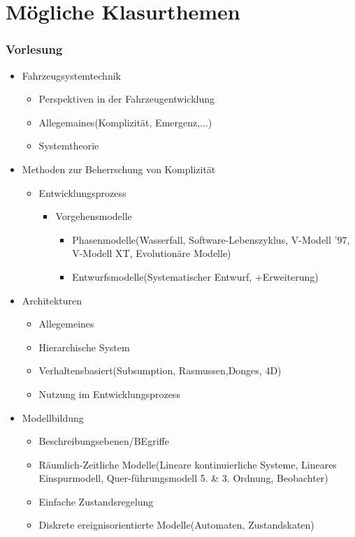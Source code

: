 \part{M\"ogliche Klasurthemen}
\section{Vorlesung}
\begin{itemize}
    \item Fahrzeugsystemtechnik\begin{itemize}
              \item Perspektiven in der Fahrzeugentwicklung
              \item Allegemaines(Komplizit\"at, Emergenz,...)
              \item Systemtheorie
          \end{itemize}
    \item Methoden zur Beherrschung von Komplizit\"at\begin{itemize}
              \item Entwicklungsprozess\begin{itemize}
                        \item Vorgehensmodelle\begin{itemize}
                                  \item Phasenmodelle(Wasserfall, Software-Lebenszyklus, V-Modell '97, V-Modell XT, Evolution\"are Modelle)
                                  \item Entwurfsmodelle(Systematischer Entwurf, +Erweiterung)
                              \end{itemize}
                    \end{itemize}
          \end{itemize}
    \item Architekturen\begin{itemize}
              \item Allegemeines
              \item Hierarchische System
              \item Verhaltensbasiert(Subsumption, Rasmussen,Donges, 4D)
              \item Nutzung im Entwicklungsprozess
          \end{itemize}
    \item Modellbildung\begin{itemize}
              \item Beschreibungsebenen/BEgriffe
              \item R\"aumlich-Zeitliche Modelle(Lineare kontinuierliche Systeme, Lineares Einspurmodell, Quer-\linebreak f\"uhrungsmodell 5. \& 3. Ordnung, Beobachter)
              \item Einfache Zustandsregelung
              \item Diskrete ereignisorientierte Modelle(Automaten, Zustandskaten)
          \end{itemize}
\end{itemize}
